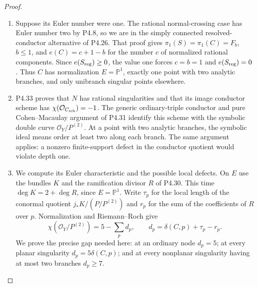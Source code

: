 \begin{proof}

\begin{enumerate}[label={$\langle1\rangle$\arabic*.},leftmargin=*]
\item Suppose its Euler number were one. The rational
normal-crossing case has Euler number two by P4.8, so we
are in the simply connected resolved-conductor alternative
of P4.26. That proof gives $\pi_1(S)=\pi_1(C)=F_b$,
$b\le1$, and
$e(C)=c+1-b$ for the number $c$ of normalized rational
components. Since $e(S_{\rm reg})\ge0$, the value one
forces $c=b=1$ and $e(S_{\rm reg})=0$.
Thus $C$ has normalization $E=\mathbb P^1$, exactly one
point with two analytic branches, and only unibranch
singular points elsewhere.

\item P4.33 proves that $N$ has rational singularities and
that its image conductor scheme has
$\chi(\mathcal O_{C_{\rm sch}})=-1$.
The generic ordinary-triple conductor and pure
Cohen--Macaulay argument of P4.31 identify this scheme
with the symbolic double curve $\mathcal O_Y/P^{(2)}$.
At a point with two analytic branches, the symbolic ideal
means order at least two along each branch. The same
argument applies: a nonzero finite-support defect in the
conductor quotient would violate depth one.

\item We compute its Euler characteristic and the possible
local defects. On $E$ use the bundles $K$ and the
ramification divisor $R$ of P4.30. This time
$\deg K=2+\deg R$, since $E=\mathbb P^1$.
Write $\tau_p$ for the local length of the conormal
quotient $j_*K/(P/P^{(2)})$ and $r_p$ for the sum of
the coefficients of $R$ over $p$. Normalization and
Riemann--Roch give
\[
 \chi(\mathcal O_Y/P^{(2)})
 =5-\sum_p d_p,
 \qquad d_p=\delta(C,p)+\tau_p-r_p.
\]
We prove the precise gap needed here: at an ordinary
node $d_p=5$; at every planar singularity
$d_p=5\delta(C,p)$; and at every nonplanar singularity
having at most two branches $d_p\ge7$.


\end{enumerate}
\end{proof}

